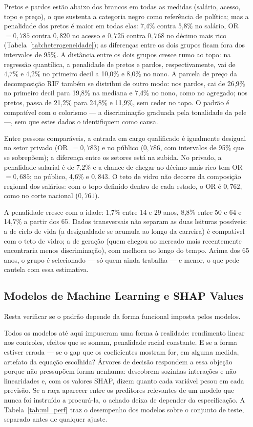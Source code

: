\documentclass[11pt, a4paper, oneside]{article}
\begin{document}
Pretos e pardos estão abaixo dos brancos em todas as medidas (salário, acesso, topo e preço), o que sustenta a categoria negro como referência de política; mas a penalidade dos pretos é maior em todas elas: 7,4\% contra 5,8\% no salário, OR~$=0,785$ contra $0,820$ no acesso e $0,725$ contra $0,768$ no décimo mais rico (Tabela~\ref{tab:heterogeneidade}); as diferenças entre os dois grupos ficam fora dos intervalos de 95\%. A distância entre os dois grupos cresce rumo ao topo: na regressão quantílica, a penalidade de pretos e pardos, respectivamente, vai de 4,7\% e 4,2\% no primeiro decil a 10,0\% e 8,0\% no nono. A parcela de preço da decomposição RIF também se distribui de outro modo: nos pardos, cai de 26,9\% no primeiro decil para 19,8\% na mediana e 7,4\% no nono, como no agregado; nos pretos, passa de 21,2\% para 24,8\% e 11,9\%, sem ceder no topo. O padrão é compatível com o colorismo --- a discriminação graduada pela tonalidade da pele \cite{telles2004} ---, sem que estes dados o identifiquem como causa.

Entre pessoas comparáveis, a entrada em cargo qualificado é igualmente desigual no setor privado (OR~$=0,783$) e no público ($0,786$, com intervalos de 95\% que se sobrepõem); a diferença entre os setores está na subida. No privado, a penalidade salarial é de 7,2\% e a chance de chegar ao décimo mais rico tem OR~$=0,685$; no público, 4,6\% e $0,843$. O teto de vidro não decorre da composição regional dos salários: com o topo definido dentro de cada estado, o OR é $0,762$, como no corte nacional ($0,761$).

A penalidade cresce com a idade: 1,7\% entre 14 e 29 anos, 8,8\% entre 50 e 64 e 14,7\% a partir dos 65. Dados transversais não separam as duas leituras possíveis: a de ciclo de vida (a desigualdade se acumula ao longo da carreira) é compatível com o teto de vidro; a de geração (quem chegou ao mercado mais recentemente encontraria menos discriminação), com melhora ao longo do tempo. Acima dos 65 anos, o grupo é selecionado --- só quem ainda trabalha --- e menor, o que pede cautela com essa estimativa.

\subsection*{Modelos de Machine Learning e SHAP Values}
Resta verificar se o padrão depende da forma funcional imposta pelos modelos. \label{subsec:ml}

Todos os modelos até aqui impuseram uma forma à realidade: rendimento linear nos
controles, efeitos que se somam, penalidade racial constante. E se a forma estiver
errada --- se o gap que os coeficientes mostram for, em alguma medida, artefato da
equação escolhida? Árvores de decisão respondem a essa objeção porque não pressupõem
forma nenhuma: descobrem sozinhas interações e não linearidades e, com os valores SHAP,
dizem quanto cada variável pesou em cada previsão. Se a raça aparecer entre os
preditores relevantes de um modelo que nunca foi instruído a procurá-la, o achado deixa
de depender da especificação. A Tabela~\ref{tab:ml_perf} traz o desempenho dos modelos
sobre o conjunto de teste, separado antes de qualquer ajuste.
\end{document}
